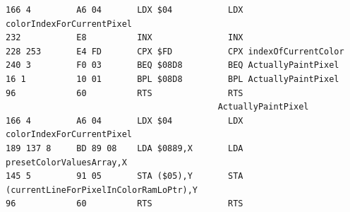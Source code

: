 \begin{lstlisting}[basicstyle=\tiny]
166 4         A6 04       LDX $04           LDX colorIndexForCurrentPixel                    
232           E8          INX               INX                                              
228 253       E4 FD       CPX $FD           CPX indexOfCurrentColor                          
240 3         F0 03       BEQ $08D8         BEQ ActuallyPaintPixel                           
16 1          10 01       BPL $08D8         BPL ActuallyPaintPixel                           
96            60          RTS               RTS                                              
                                          ActuallyPaintPixel                               
166 4         A6 04       LDX $04           LDX colorIndexForCurrentPixel                    
189 137 8     BD 89 08    LDA $0889,X       LDA presetColorValuesArray,X                     
145 5         91 05       STA ($05),Y       STA (currentLineForPixelInColorRamLoPtr),Y       
96            60          RTS               RTS                               
\end{lstlisting}


